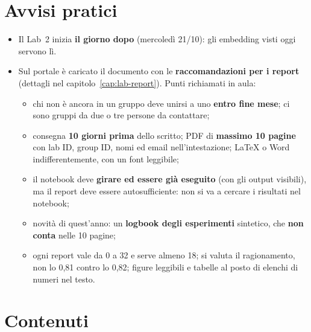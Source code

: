 \section{Avvisi pratici}
\begin{itemize}
  \item Il Lab~2 inizia \textbf{il giorno dopo} (mercoledì 21/10): gli embedding visti oggi servono lì.
  \item Sul portale è caricato il documento con le \textbf{raccomandazioni per i report} (dettagli nel
    capitolo~\ref{cap:lab-report}). Punti richiamati in aula:
    \begin{itemize}
      \item chi non è ancora in un gruppo deve unirsi a uno \textbf{entro fine mese}; ci sono gruppi da due o
        tre persone da contattare;
      \item consegna \textbf{10 giorni prima} dello scritto; PDF di \textbf{massimo 10 pagine} con lab ID,
        group ID, nomi ed email nell'intestazione; LaTeX o Word indifferentemente, con un font leggibile;
      \item il notebook deve \textbf{girare ed essere già eseguito} (con gli output visibili), ma il report
        deve essere autosufficiente: non si va a cercare i risultati nel notebook;
      \item novità di quest'anno: un \textbf{logbook degli esperimenti} sintetico, che \textbf{non conta}
        nelle 10 pagine;
      \item ogni report vale da 0 a 32 e serve almeno 18; si valuta il ragionamento, non lo 0,81 contro lo
        0,82; figure leggibili e tabelle al posto di elenchi di numeri nel testo.
    \end{itemize}
\end{itemize}

\section{Contenuti}

